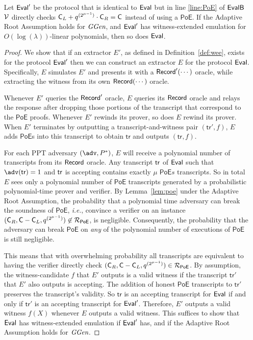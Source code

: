 \begin{lemma} \label{lemma:poe_security}
Let $\textsf{{Eval}}'$ be the protocol that is identical to $\textsf{{Eval}}$ but in line \ref{line:PoE} of $\textsf{{EvalB}}$ $\mathcal{V}$ directly checks $\gr{C}_L+ q^{(2^{\mu-1})} \cdot \gr{C}_R=\gr{C}$ instead of using a $\textsf{PoE}$. If the Adaptive Root Assumption holds for $\textit{GGen}$, and $\textsf{{Eval}}'$ has witness-extended emulation for $O(\log(\lambda))$-linear polynomials, then so does $\textsf{{Eval}}$.
\end{lemma}

\begin{proof}
We show that if an extractor $E'$, as defined in Definition~\ref{def:wee}, exists for the protocol $\textsf{{Eval}}'$ then we can construct an extractor $E$ for the protocol $\textsf{{Eval}}$. Specifically, $E$ simulates $E'$ and presents it with a $\textsf{{Record}}'(\cdots)$ oracle, while extracting the witness from its own $\textsf{{Record}}(\cdots)$ oracle.

Whenever $E'$ queries the $\textsf{{Record}}'$ oracle, $E$ queries its $\textsf{{Record}}$ oracle and relays the response after dropping those portions of the transcript that correspond to the $\mathsf{PoE}$ proofs. Whenever $E'$ rewinds its prover, so does $E$ rewind its prover. When $E'$ terminates by outputting a transcript-and-witness pair $(\mathsf{tr}', f)$, $E$ adds $\mathsf{PoE}$s into this transcript to obtain $\mathsf{tr}$ and outputs $(\mathsf{tr}, f)$.

For each PPT adversary $(\adv,P^*)$, $E$ will receive a polynomial number of transcripts from its $\textsf{{Record}}$ oracle. Any transcript $\textsf{{tr}}$ of $\textsf{{Eval}}$ such that $\adv(\tr)=1$ and $\textsf{{tr}}$ is accepting contains exactly $\mu$ $\textsf{PoE}s$ transcripts. 
So in total $E$ sees only a polynomial number of $\textsf{PoE}$ transcripts generated by a probabilistic polynomial-time prover and verifier. By Lemma~\ref{lem:poe} under the Adaptive Root Assumption, the probability that a polynomial time adversary can break the soundness of $\textsf{PoE}$, \emph{i.e.}, convince a verifier on an instance $(\gr{C}_R,\gr{C}-\gr{C}_{L},q^{(2^{\mu-1})})\not\in\mathcal{R}_{\textsf{PoE}}$, is negligible. 
Consequently, the probability that the adversary can break $\textsf{PoE}$ on \emph{any} of the polynomial number of executions of $\mathsf{PoE}$ is still negligible.

This means that with overwhelming probability all transcripts are equivalent to having the verifier directly check $(\gr{C}_R,\gr{C}-\gr{C}_{L},q^{(2^{\mu-1})})\in\mathcal{R}_{\textsf{PoE}}$. By assumption, the witness-candidate $f$ that $E'$ outputs is a valid witness if the transcript $\mathsf{tr}'$ that $E'$ also outputs is accepting. The addition of honest $\mathsf{PoE}$ transcripts to $\mathsf{tr}'$ preserves the transcript's validity. So $\mathsf{tr}$ is an accepting transcript for $\textsf{{Eval}}$ if and only if $\mathsf{tr}'$ is an accepting transcript for $\textsf{{Eval}}'$. Therefore, $E'$ outputs a valid witness $f(X)$ whenever $E$ outputs a valid witness. This suffices to show that $\textsf{{Eval}}$ has witness-extended emulation if $\textsf{{Eval}}'$ has, and if the Adaptive Root Assumption holds for $\textit{GGen}$.
\end{proof}

